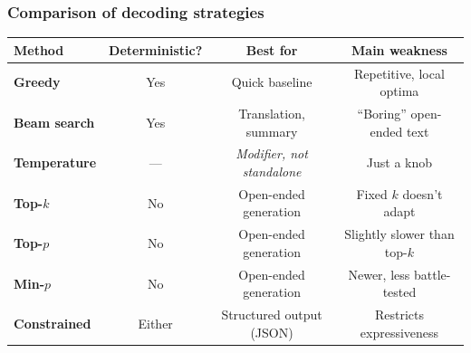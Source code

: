 \documentclass[aspectratio=169]{beamer}
\begin{document}
\begin{frame}
\frametitle{Comparison of decoding strategies}

\vspace{-0.3cm}
\renewcommand{\arraystretch}{1.4}
\begin{center}
\small
\begin{tabular}{>{\bfseries}l c c c}
  \textbf{Method} & \textbf{Deterministic?} & \textbf{Best for} & \textbf{Main weakness} \\
  \hline
  \textcolor{popblue}{Greedy} & Yes & Quick baseline & Repetitive, local optima \\[2pt]
  \textcolor{popblue}{Beam search} & Yes & Translation, summary & ``Boring'' open-ended text \\[2pt]
  \textcolor{sampred}{Temperature} & --- & \textit{Modifier, not standalone} & Just a knob \\[2pt]
  \textcolor{orange1}{Top-$k$} & No & Open-ended generation & Fixed $k$ doesn't adapt \\[2pt]
  \textcolor{paramgreen}{Top-$p$} & No & Open-ended generation & Slightly slower than top-$k$ \\[2pt]
  \textcolor{violet1}{Min-$p$} & No & Open-ended generation & Newer, less battle-tested \\[2pt]
  \textcolor{orange1}{Constrained} & Either & Structured output (JSON) & Restricts expressiveness \\
  \hline
\end{tabular}
\end{center}

\vspace{0.4cm}
\begin{center}
\end{center}
\end{frame}
\end{document}
